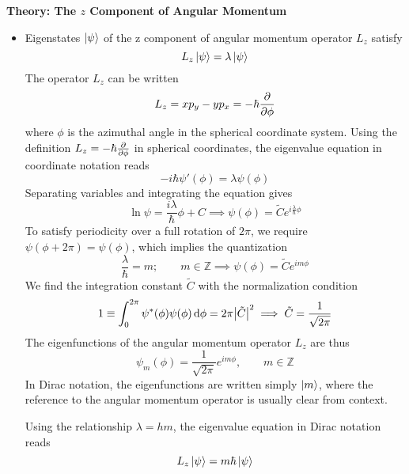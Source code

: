 \documentclass[11pt, a4paper]{article}
\newcommand{\diff}{\mathop{}\!\mathrm{d}} %
\begin{document}
\textbf{Theory: The $ z $ Component of Angular Momentum}
\begin{itemize}
	\item Eigenstates $ \ket{\psi} $ of the z component of angular momentum operator $ L_{z} $ satisfy
	\begin{equation*}
		L_{z}\ket{\psi} = \lambda \ket{\psi}
	\end{equation*}
	The operator $ L_{z} $ can be written
	\begin{equation*}
		L_{z} = xp_{y} - y p_{x} = - \hbar \pdv{\phi}
	\end{equation*}
	where $ \phi $ is the azimuthal angle in the spherical coordinate system. Using the definition $ L_{z} = - \hbar \pdv{\phi} $ in spherical coordinates, the eigenvalue equation in coordinate notation reads
	\begin{equation*}
		-i\hbar \psi'(\phi) = \lambda \psi(\phi)
	\end{equation*}
	Separating variables and integrating the equation gives
	\begin{equation*}
		\ln \psi = \frac{i\lambda}{\hbar} \phi + C \implies \psi(\phi) = \tilde{C}e^{i\frac{\lambda}{\hbar}\phi}
	\end{equation*}
	To satisfy periodicity over a full rotation of $ 2\pi $, we require $ \psi(\phi + 2\pi) = \psi(\phi) $, which implies the quantization
	\begin{equation*}
		\frac{\lambda}{\hbar} = m; \qquad m \in \mathbb{Z} \implies \psi(\phi) = \tilde{C}e^{im\phi}
	\end{equation*}
	We find the integration constant $ \tilde{C} $ with the normalization condition
	\begin{equation*}
		1 \equiv \int_{0}^{2\pi}\psi^{*}(\phi)\psi(\phi)\diff \phi = 2\pi \abs{\tilde{C}}^{2} \implies \tilde{C} = \frac{1}{\sqrt{2\pi}}
	\end{equation*}
	The eigenfunctions of the angular momentum operator $ L_{z} $ are thus
	\begin{equation*}
		\psi_{m}(\phi) = \frac{1}{\sqrt{2\pi}}e^{im\phi}, \qquad m \in \mathbb{Z}
	\end{equation*}
	In Dirac notation, the eigenfunctions are written simply $ \ket{m} $, where the reference to the angular momentum operator is usually clear from context. 
	
	Using the relationship $ \lambda = h m $, the eigenvalue equation in Dirac notation reads
	\begin{equation*}
		L_{z}\ket{\psi} = m \hbar \ket{\psi}
	\end{equation*}
	
	
\end{itemize}
\end{document}
